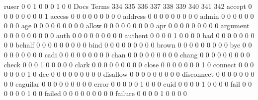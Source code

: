 \documentclass[compress,8pt]{beamer}
\begin{document}
\begin{frame}
\begin{Schunk}
  ruser                                      0   0   1   0   0   0   1   0   0
                                          Docs
Terms                                      334 335 336 337 338 339 340 341 342
  accept                                     0   0   0   0   0   0   0   0   1
  access                                     0   0   0   0   0   0   0   0   0
  address                                    0   0   0   0   0   0   0   0   0
  admin                                      0   0   0   0   0   0   0   0   0
  age                                        0   0   0   0   0   0   0   0   0
  allow                                      0   0   0   0   0   0   0   0   0
  apr                                        0   0   0   0   0   0   0   0   0
  argument                                   0   0   0   0   0   0   0   0   0
  auth                                       0   0   0   0   0   0   0   0   0
  authent                                    0   0   0   0   1   0   0   0   0
  bad                                        0   0   0   0   0   0   0   0   0
  behalf                                     0   0   0   0   0   0   0   0   0
  bind                                       0   0   0   0   0   0   0   0   0
  brown                                      0   0   0   0   0   0   0   0   0
  bye                                        0   0   0   0   0   0   0   0   0
  cadi                                       0   0   0   0   0   0   0   0   0
  chan                                       0   0   0   0   0   0   0   0   0
  chang                                      0   0   0   0   0   0   0   0   0
  check                                      0   0   0   1   0   0   0   0   0
  clark                                      0   0   0   0   0   0   0   0   0
  close                                      0   0   0   0   0   0   0   1   0
  connect                                    0   0   0   0   0   0   0   1   0
  dec                                        0   0   0   0   0   0   0   0   0
  disallow                                   0   0   0   0   0   0   0   0   0
  disconnect                                 0   0   0   0   0   0   0   0   0
  eaguilar                                   0   0   0   0   0   0   0   0   0
  error                                      0   0   0   0   0   1   0   0   0
  euid                                       0   0   0   0   1   0   0   0   0
  fail                                       0   0   0   0   0   0   1   0   0
  failed                                     0   0   0   0   0   0   0   0   0
  failure                                    0   0   0   0   1   0   0   0   0

\end{Schunk}
\end{frame}
\end{document}
